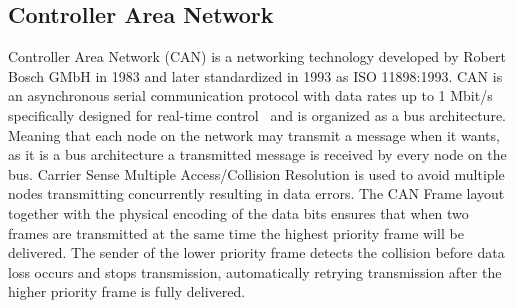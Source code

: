 \subsection{Controller Area Network}
\label{sec:can}
Controller Area Network (CAN) is a networking technology developed by Robert Bosch GMbH in 1983 and later standardized in 1993 as ISO 11898:1993. CAN is an asynchronous serial communication protocol with data rates up to 1 Mbit/s specifically designed for real-time control~\cite{ISO11898} and is organized as a bus architecture. Meaning that each node on the network may transmit a message when it wants, as it is a bus architecture a transmitted message is received by every node on the bus. Carrier Sense Multiple Access/Collision Resolution is used to avoid multiple nodes transmitting concurrently resulting in data errors. The CAN Frame layout together with the physical encoding of the data bits ensures that when two frames are transmitted at the same time the highest priority frame will be delivered. The sender of the lower priority frame detects the collision before data loss occurs and stops transmission, automatically retrying transmission after the higher priority frame is fully delivered. 